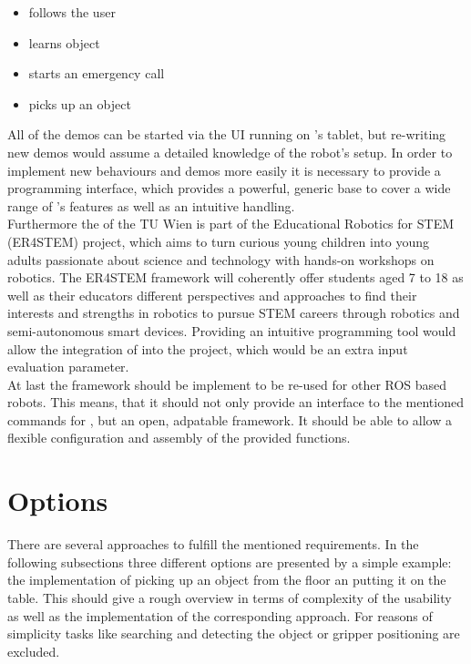\begin{itemize}
	\item \hobbit{} follows the user
	\item \hobbit{} learns object
	\item \hobbit{} starts an emergency call
	\item \hobbit{} picks up an object
\end{itemize}

All of the demos can be started via the UI running on \hobbit{}'s tablet, but re-writing new demos would assume a detailed knowledge of the robot's setup. In order to implement new behaviours and demos more easily it is necessary to provide a programming interface, which provides a powerful, generic base to cover a wide range of \hobbit's features as well as an intuitive handling.\\

Furthermore the \ACIN{} of the TU Wien is part of the Educational Robotics for STEM (ER4STEM) project, which aims to turn curious young children into young adults passionate about science and technology with hands-on workshops on robotics. The ER4STEM framework will coherently offer students aged 7 to 18 as well as their educators different perspectives and approaches to find their interests and strengths in robotics to pursue STEM careers through robotics and semi-autonomous smart devices. \cite{ER4STEMACIN} Providing an intuitive programming tool would allow the integration of \hobbit{} into the project, which would be an extra input evaluation parameter.\\

At last the framework should be implement to be re-used for other ROS based robots. This means, that it should not only provide an interface to the mentioned commands for \hobbit{}, but an open, adpatable framework. It should be able to allow a flexible configuration and assembly of the provided functions.

\section{Options} \label{sec:Options}
There are several approaches to fulfill the mentioned requirements. In the following subsections three different options are presented by a simple example: the implementation of picking up an object from the floor an putting it on the table. This should give a rough overview in terms of complexity of the usability as well as the implementation of the corresponding approach. For reasons of simplicity tasks like searching and detecting the object or gripper positioning are excluded.


